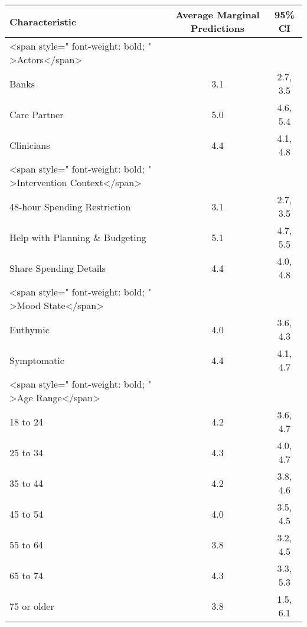 \documentclass[border=1mm]{standalone}
\begin{document}
\begin{tabular}{l|c|c}
\hline
\textbf{Characteristic} & \textbf{Average Marginal Predictions} & \textbf{95\% CI}\\
\hline
<span style=" font-weight: bold;    " >Actors</span> &  & \\
\hline
\hspace{1em}Banks & 3.1 & 2.7, 3.5\\
\hline
\hspace{1em}Care Partner & 5.0 & 4.6, 5.4\\
\hline
\hspace{1em}Clinicians & 4.4 & 4.1, 4.8\\
\hline
<span style=" font-weight: bold;    " >Intervention Context</span> &  & \\
\hline
\hspace{1em}48-hour Spending Restriction & 3.1 & 2.7, 3.5\\
\hline
\hspace{1em}Help with Planning \& Budgeting & 5.1 & 4.7, 5.5\\
\hline
\hspace{1em}Share Spending Details & 4.4 & 4.0, 4.8\\
\hline
<span style=" font-weight: bold;    " >Mood State</span> &  & \\
\hline
\hspace{1em}Euthymic & 4.0 & 3.6, 4.3\\
\hline
\hspace{1em}Symptomatic & 4.4 & 4.1, 4.7\\
\hline
<span style=" font-weight: bold;    " >Age Range</span> &  & \\
\hline
\hspace{1em}18 to 24 & 4.2 & 3.6, 4.7\\
\hline
\hspace{1em}25 to 34 & 4.3 & 4.0, 4.7\\
\hline
\hspace{1em}35 to 44 & 4.2 & 3.8, 4.6\\
\hline
\hspace{1em}45 to 54 & 4.0 & 3.5, 4.5\\
\hline
\hspace{1em}55 to 64 & 3.8 & 3.2, 4.5\\
\hline
\hspace{1em}65 to 74 & 4.3 & 3.3, 5.3\\
\hline
\hspace{1em}75 or older & 3.8 & 1.5, 6.1\\

\end{tabular}
\end{document}
